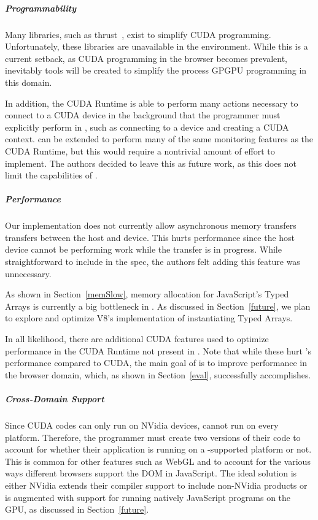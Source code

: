 
\subparagraph{Programmability} 
Many libraries, such as thrust~\cite{thrust}, exist to simplify CUDA
programming. Unfortunately, these libraries are unavailable in the \name environment. While
this is a current setback, as CUDA programming in the browser becomes prevalent,
inevitably tools will be created to simplify the process GPGPU programming in
this domain.

In addition, the CUDA Runtime is able to perform many actions necessary to
connect to a CUDA device in the background that the programmer
must explicitly perform in \namens, such as connecting to a device and creating
a CUDA context. \name can be extended to perform many of the same
monitoring features as the CUDA Runtime, but this would require a nontrivial
amount of effort to implement. The authors decided to leave this as future work,
as this does not limit the capabilities of \namens.

\subparagraph{Performance}
Our implementation does not currently allow asynchronous memory transfers
transfers between the host and device. This hurts performance since the host
device cannot be performing work while the transfer is in progress. While
straightforward to include in the \name spec, the authors felt adding this
feature was unnecessary. 

As shown in Section~\ref{memSlow}, memory allocation for JavaScript's Typed Arrays
is currently a big bottleneck in \namens. As discussed in Section~\ref{future},
we plan to explore and optimize V8's implementation of instantiating Typed Arrays.

In all likelihood, there are additional CUDA features used to optimize
performance in the CUDA Runtime not present in \namens. Note that
while these hurt \namens's performance compared to CUDA, the main goal of \name
is to improve performance in the browser domain, which, as shown in
Section~\ref{eval}, \name successfully accomplishes.

\subparagraph{Cross-Domain Support} Since CUDA codes can only run on NVidia
devices, \name cannot run on every platform. Therefore, the programmer must
create two versions of their code to account for whether their application is
running on a \namens-supported platform or not. This is common for other
features such as WebGL and to account for the various ways different browsers
support the DOM in JavaScript. The ideal solution is either NVidia extends their
compiler support to include non-NVidia products or \name is augmented with
support for running natively JavaScript programs on the GPU, as discussed in
Section~\ref{future}.

